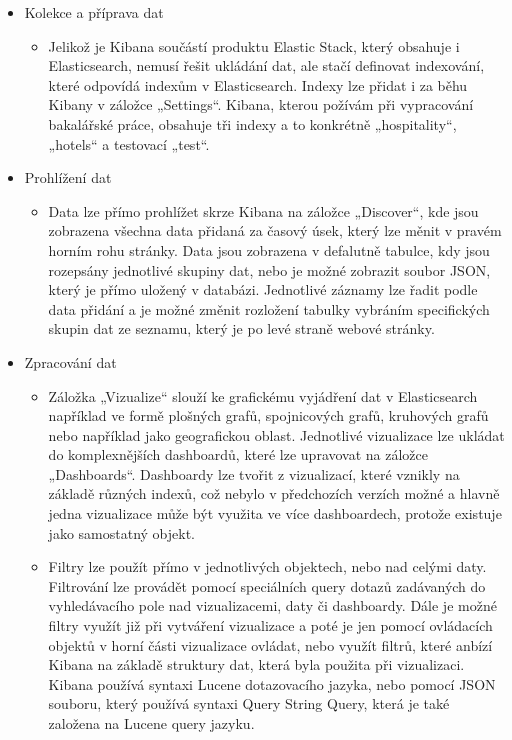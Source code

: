 \documentclass[czech,BP]{thesiskiv}
\begin{document}
 \begin{itemize}
 	\item Kolekce a příprava dat
 	\begin{itemize}
 		\item Jelikož je Kibana součástí produktu Elastic Stack, který obsahuje i Elasticsearch, nemusí řešit ukládání dat, ale stačí definovat indexování, které odpovídá indexům v Elasticsearch. Indexy lze přidat i za běhu Kibany v záložce „Settings“. Kibana, kterou požívám při vypracování bakalářské práce, obsahuje tři indexy a to konkrétně „hospitality“, „hotels“ a testovací „test“. 
 	\end{itemize}
	\item Prohlížení dat
	\begin{itemize}
		\item Data lze přímo prohlížet skrze Kibana na záložce „Discover“, kde jsou zobrazena všechna data přidaná za časový úsek, který lze měnit v pravém horním rohu stránky. Data jsou zobrazena v defalutně tabulce, kdy jsou rozepsány jednotlivé skupiny dat, nebo je možné zobrazit soubor JSON, který je přímo uložený  v databázi. Jednotlivé záznamy lze řadit podle data přidání a je možné změnit rozložení tabulky vybráním specifických skupin dat ze seznamu, který je po levé straně webové stránky.
	\end{itemize}
 	\item Zpracování dat
 	\begin{itemize}
 		\item Záložka „Vizualize“ slouží ke grafickému vyjádření dat v Elasticsearch například ve formě plošných grafů, spojnicových grafů, kruhových grafů nebo například jako geografickou oblast. Jednotlivé vizualizace lze ukládat do komplexnějších dashboardů, které lze upravovat na záložce „Dashboards“. Dashboardy lze tvořit z vizualizací, které vznikly na základě různých indexů, což nebylo v předchozích verzích možné a hlavně jedna vizualizace může být využita ve více dashboardech, protože existuje jako samostatný objekt.
 		
 		\item Filtry lze použít přímo v jednotlivých objektech, nebo nad celými daty. Filtrování lze provádět pomocí speciálních query dotazů zadávaných do vyhledávacího pole nad vizualizacemi, daty či dashboardy. Dále je možné filtry využít již při vytváření vizualizace a poté je jen pomocí ovládacích objektů v horní části vizualizace ovládat, nebo využít filtrů, které anbízí Kibana na základě struktury dat, která byla použita při vizualizaci. Kibana používá syntaxi Lucene dotazovacího jazyka, nebo pomocí JSON souboru, který používá syntaxi  Query String Query, která je také založena na Lucene query jazyku.
 	\end{itemize}
 \end{itemize}
 
\end{document}
